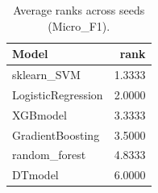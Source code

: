 \begin{table}[t]
\centering
\begin{tabular}{lr}
\toprule
Model & rank \\
\midrule
sklearn_SVM & 1.3333 \\
LogisticRegression & 2.0000 \\
XGBmodel & 3.3333 \\
GradientBoosting & 3.5000 \\
random_forest & 4.8333 \\
DTmodel & 6.0000 \\
\bottomrule
\end{tabular}
\caption{Average ranks across seeds (Micro_F1).}
\label{tab:avg_rank_Micro_F1}
\end{table}